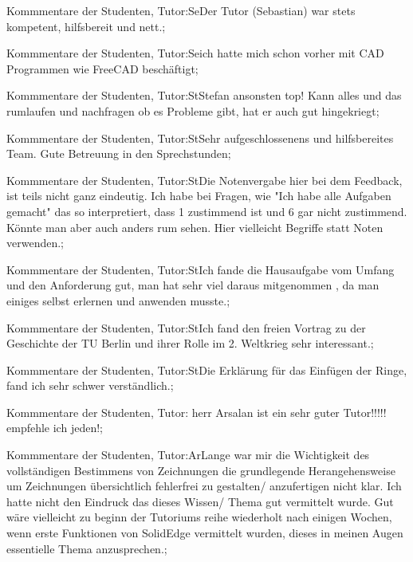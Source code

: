 \documentclass[10pt]{beamer}
\begin{document}
\begin{frame}[fragile]{Kommmentare der Studenten, Tutor:Se}Der Tutor (Sebastian) war stets kompetent, hilfsbereit und nett.;
 \end{frame}
\begin{frame}[fragile]{Kommmentare der Studenten, Tutor:Se}ich hatte mich schon vorher mit CAD Programmen wie FreeCAD beschäftigt;
 \end{frame}
\begin{frame}[fragile]{Kommmentare der Studenten, Tutor:St}Stefan ansonsten top! Kann alles und das rumlaufen und nachfragen ob es Probleme gibt, hat er auch gut hingekriegt;
 \end{frame}
\begin{frame}[fragile]{Kommmentare der Studenten, Tutor:St}Sehr aufgeschlossenens und hilfsbereites Team. Gute Betreuung in den Sprechstunden;
 \end{frame}
\begin{frame}[fragile]{Kommmentare der Studenten, Tutor:St}Die Notenvergabe hier bei dem Feedback, ist teils nicht ganz eindeutig. Ich habe bei Fragen, wie "Ich habe alle Aufgaben gemacht" das so interpretiert, dass 1 zustimmend ist und 6 gar nicht zustimmend. Könnte man aber auch anders rum sehen. Hier vielleicht Begriffe statt Noten verwenden.;
 \end{frame}
\begin{frame}[fragile]{Kommmentare der Studenten, Tutor:St}Ich fande die Hausaufgabe vom Umfang und den Anforderung gut, man hat sehr viel daraus mitgenommen , da man einiges selbst erlernen und anwenden musste.;
 \end{frame}
\begin{frame}[fragile]{Kommmentare der Studenten, Tutor:St}Ich fand den freien Vortrag zu der Geschichte der TU Berlin und ihrer Rolle im 2. Weltkrieg sehr interessant.;
 \end{frame}
\begin{frame}[fragile]{Kommmentare der Studenten, Tutor:St}Die Erklärung für das Einfügen der Ringe, fand ich sehr schwer verständlich.;
 \end{frame}
\begin{frame}[fragile]{Kommmentare der Studenten, Tutor: }herr Arsalan ist ein sehr guter Tutor!!!!! empfehle ich jeden!;
 \end{frame}
\begin{frame}[fragile]{Kommmentare der Studenten, Tutor:Ar}Lange war mir die Wichtigkeit des vollständigen Bestimmens von Zeichnungen   die grundlegende Herangehensweise um Zeichnungen übersichtlich   fehlerfrei zu gestalten/ anzufertigen nicht klar.   Ich hatte nicht den Eindruck das dieses Wissen/ Thema gut vermittelt wurde.  Gut wäre vielleicht zu beginn der Tutoriums reihe   wiederholt nach einigen Wochen, wenn erste Funktionen von SolidEdge vermittelt wurden, dieses in meinen Augen essentielle Thema anzusprechen.;
 \end{frame}
\end{document}
